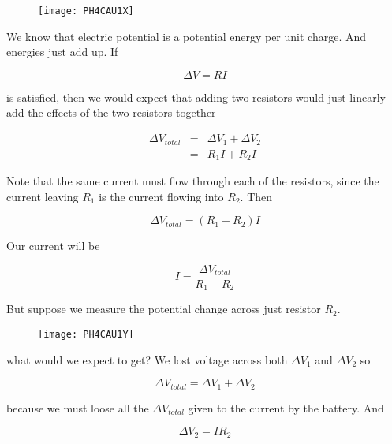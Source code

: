 \begin{figure}[h!]
	\centering
	\texttt{[image: PH4CAU1X]}
\end{figure}

We know that electric potential is a potential energy per unit charge. And energies just add up. If 

\begin{equation*}
	\Delta V=RI
\end{equation*}

\noindent is satisfied, then we would expect that adding two resistors would just linearly add the effects of the two resistors together

\begin{eqnarray*}
	\Delta V_{total} &=&\Delta V_{1}+\Delta V_{2} \\
	&=&R_{1}I+R_{2}I
\end{eqnarray*}

Note that the same current must flow through each of the resistors, since the current leaving $R_{1}$ is the current flowing into $R_{2}.$ Then 

\begin{equation*}
	\Delta V_{total}=\left( R_{1}+R_{2}\right) I
\end{equation*}

\noindent Our current will be 

\begin{equation*}
	I=\frac{\Delta V_{total}}{R_{1}+R_{2}}
\end{equation*}

But suppose we measure the potential change across just resistor $R_{2}.$ 

\begin{figure}[h!]
	\centering
	\texttt{[image: PH4CAU1Y]}
\end{figure}

\noindent what would we expect to get? We lost voltage across both $\Delta V_{1}$ and $\Delta V_{2}$ so 

\begin{equation*}
	\Delta V_{total}=\Delta V_{1}+\Delta V_{2}
\end{equation*}

\noindent because we must loose all the $\Delta V_{total}$ given to the current by the
battery. And 

\begin{equation*}
	\Delta V_{2}=IR_{2}
\end{equation*}

